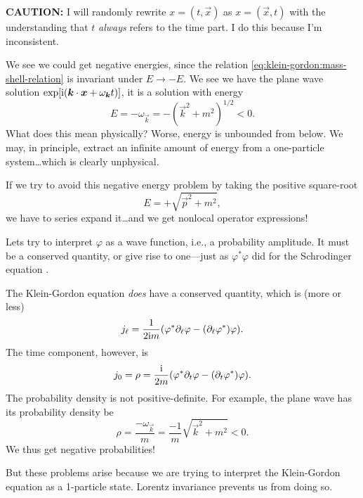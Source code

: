 \begin{ddanger}
\textbf{CAUTION:}
I will randomly rewrite $x=(t,\vec{x})$ as $x=(\vec{x},t)$ with the
understanding that $t$ \emph{always} refers to the time part. I do this
because I'm inconsistent.
\end{ddanger}

We see we could get negative energies, since the relation
\eqref{eq:klein-gordon:mass-shell-relation} is invariant under
$E\to-E$. We see we have the plane wave solution
$\exp[\I(\vec{k}\cdot\vec{x}+\omega_{\vec{k}}{t})]$, it is a solution with energy
\begin{equation}
E = -\omega_{\vec{k}} = -(\vec{k}^{2}+m^{2})^{1/2} < 0.
\end{equation}
What does this mean physically? Worse, energy is unbounded from
below. We may, in principle, extract an infinite amount of energy from a
one-particle system\dots which is clearly unphysical.

If we try to avoid this negative energy problem by taking the positive
square-root
\begin{equation}
E=+\sqrt{\vec{p}^{2}+m^{2}},
\end{equation}
we have to series expand it\dots and we get nonlocal operator
expressions!

Lets try to interpret $\varphi$ as a wave function, i.e., a probability
amplitude. It must be a conserved quantity, or give rise to one---just
as $\varphi^{*}\varphi$ did for the Schrodinger equation
.

The Klein-Gordon equation \emph{does} have a conserved quantity, which
is (more or less)
\begin{equation}
j_{\ell} = \frac{1}{2{\rm i} m}(\varphi^{*}\partial_{\ell}\varphi-(\partial_{\ell}\varphi^{*})\varphi).
\end{equation}
The time component, however, is
\begin{equation}
j_{0} = \rho = \frac{{\rm i}}{2m}(\varphi^{*}\partial_{t}\varphi-(\partial_{t}\varphi^{*})\varphi).
\end{equation}
The probability density is not positive-definite. For example, the
plane wave has its probability density be
\begin{equation}
\rho=\frac{-\omega_{\vec{k}}}{m}=\frac{-1}{m}\sqrt{\vec{k}^{2}+m^{2}}<0.
\end{equation}
We thus get negative probabilities!

But these problems arise because we are trying to interpret the
Klein-Gordon equation as a 1-particle state. Lorentz invariance prevents
us from doing so.

